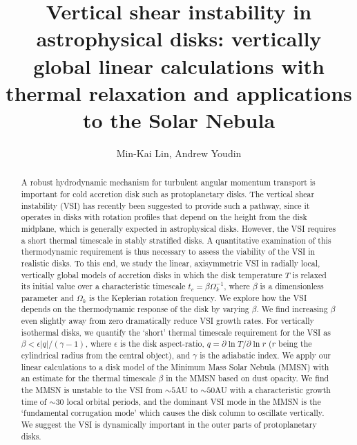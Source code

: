 \documentclass[iop]{emulateapj}
\newcommand{\p}{\partial}
\begin{document}
\title{Vertical shear instability in astrophysical disks: vertically global linear calculations with thermal relaxation and applications to the Solar Nebula} 
\author{Min-Kai Lin, Andrew Youdin}

\begin{abstract}
  A robust hydrodynamic mechanism for turbulent angular momentum
  transport is important for cold accretion disk such as 
  protoplanetary disks. The vertical shear instability (VSI) has 
  recently been suggested to provide such a pathway, since it operates in
  disks with rotation profiles that depend on the height from the 
  disk midplane, which is generally expected in  
  astrophysical disks. However, the VSI requires a short thermal
  timescale in stably stratified disks.  
  A quantitative examination of this thermodynamic 
  requirement is thus necessary to assess the viability of
  the VSI in realistic disks. To this end,  
  we study the linear, axisymmetric VSI in radially local, 
  vertically global models of accretion disks in which the disk  
  temperature $T$ is relaxed its initial value over a characteristic timescale 
  $t_c=\beta\Omega_k^{-1}$, where $\beta$ is a dimensionless parameter 
  and $\Omega_k$ is the Keplerian rotation frequency. We explore how
  the VSI depends on the thermodynamic response of the disk by
  varying $\beta$. We find increasing $\beta$ even slightly away from 
  zero dramatically reduce VSI growth rates. 
  For vertically isothermal disks, we quantify the
  `short' thermal timescale requirement for the VSI as $\beta < \epsilon|q|/(\gamma-1)$, where
  $\epsilon$ is the disk aspect-ratio, $q = \p\ln T/\p\ln r$  ($r$
  being the cylindrical radius from the central object), and 
  $\gamma$ is the adiabatic index. 
  We apply our linear calculations  
  to a disk model of the Minimum Mass Solar Nebula (MMSN) with an  
  estimate for the thermal timescale $\beta$ in the MMSN based on dust
  opacity. We find the MMSN is unstable to the VSI from $\sim 5$AU to $\sim 50$AU with  
  a characteristic growth time of $\sim 30$ local orbital 
  periods, and the dominant VSI mode in the MMSN is the `fundamental
  corrugation mode' which causes the disk column to oscillate
  vertically. We suggest the VSI is dynamically important in the outer
  parts of protoplanetary disks. 
\end{abstract}
\end{document}
